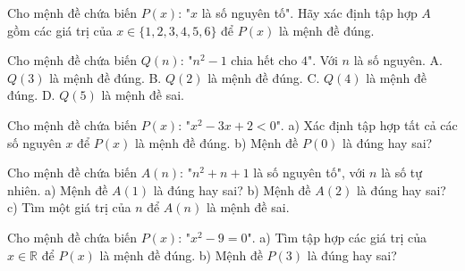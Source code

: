 \begin{ex}
Cho mệnh đề chứa biến $P(x)$: "$x$ là số nguyên tố". Hãy xác định tập hợp $A$ gồm các giá trị của $x \in \{1, 2, 3, 4, 5, 6\}$ để $P(x)$ là mệnh đề đúng.

\begin{ex}
Cho mệnh đề chứa biến $Q(n)$: "$n^2 - 1$ chia hết cho $4$". Với $n$ là số nguyên.
\choiceTF
{\True A. $Q(3)$ là mệnh đề đúng.}
{B. $Q(2)$ là mệnh đề đúng.}
{C. $Q(4)$ là mệnh đề đúng.}
{D. $Q(5)$ là mệnh đề sai.}
\end{ex}

\begin{ex}
Cho mệnh đề chứa biến $P(x)$: "$x^2 - 3x + 2 < 0$".
a) Xác định tập hợp tất cả các số nguyên $x$ để $P(x)$ là mệnh đề đúng.
b) Mệnh đề $P(0)$ là đúng hay sai?
\end{ex}

\begin{ex}
Cho mệnh đề chứa biến $A(n)$: "$n^2 + n + 1$ là số nguyên tố", với $n$ là số tự nhiên.
a) Mệnh đề $A(1)$ là đúng hay sai?
b) Mệnh đề $A(2)$ là đúng hay sai?
c) Tìm một giá trị của $n$ để $A(n)$ là mệnh đề sai.
\end{ex}

\begin{ex}
Cho mệnh đề chứa biến $P(x)$: "$x^2 - 9 = 0$".
a) Tìm tập hợp các giá trị của $x \in \mathbb{R}$ để $P(x)$ là mệnh đề đúng.
b) Mệnh đề $P(3)$ là đúng hay sai?
\end{ex}
\end{ex}
